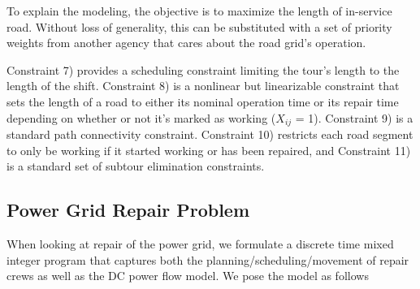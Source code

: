 \documentclass{article}
\begin{document}
To explain the modeling, the objective is to maximize the length of in-service road. Without loss of generality, this can be substituted with a set of priority weights from another agency that cares about the road grid's operation.

Constraint 7) provides a scheduling constraint limiting the tour's length to the length of the shift. Constraint 8) is a nonlinear but linearizable constraint that sets the length of a road to either its nominal operation time or its repair time depending on whether or not it's marked as working ($X_{ij}$ = 1). Constraint 9) is a standard path connectivity constraint. Constraint 10) restricts each road segment to only be working if it started working or has been repaired, and Constraint 11) is a standard set of subtour elimination constraints.
	\subsection{Power Grid Repair Problem}
	When looking at repair of the power grid, we formulate a discrete time mixed integer program that captures both the planning/scheduling/movement of repair crews as well as the DC power flow model. We pose the model as follows
	\small
\end{document}
